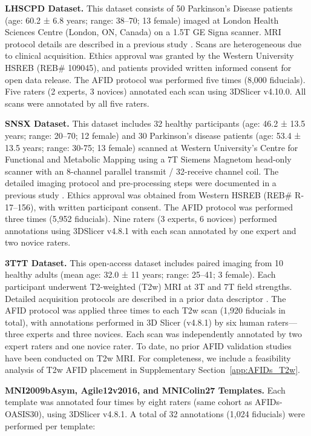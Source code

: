 \textbf{LHSCPD Dataset.} This dataset consists of 50 Parkinson’s Disease patients (age: 60.2 ± 6.8 years; range: 38–70; 13 female) imaged at London Health Sciences Centre (London, ON, Canada) on a 1.5T GE Signa scanner. MRI protocol details are described in a previous study \cite{Abbass2022-lf}. Scans are heterogeneous due to clinical acquisition. Ethics approval was granted by the Western University HSREB (REB\# 109045), and patients provided written informed consent for open data release. The AFID protocol was performed five times (8,000 fiducials). Five raters (2 experts, 3 novices) annotated each scan using 3DSlicer v4.10.0. All scans were annotated by all five raters.

\textbf{SNSX Dataset.} This dataset includes 32 healthy participants (age: 46.2 ± 13.5 years; range: 20–70; 12 female) and 30 Parkinson's disease patients (age: 53.4 ± 13.5 years; range: 30-75; 13 female) scanned at Western University's Centre for Functional and Metabolic Mapping using a 7T Siemens Magnetom head-only scanner with an 8-channel parallel transmit / 32-receive channel coil. The detailed imaging protocol and pre-processing steps were documented in a previous study \cite{Lau2020-dh}. Ethics approval was obtained from Western HSREB (REB\# R-17–156), with written participant consent. The AFID protocol was performed three times (5,952 fiducials). Nine raters (3 experts, 6 novices) performed annotations using 3DSlicer v4.8.1 with each scan annotated by one expert and two novice raters.

\textbf{3T7T Dataset.} This open-access dataset includes paired imaging from 10 healthy adults (mean age: 32.0 ± 11 years; range: 25–41; 3 female). Each participant underwent T2-weighted (T2w) MRI at 3T and 7T field strengths. Detailed acquisition protocols are described in a prior data descriptor \cite{Chen2023-cn}. The AFID protocol was applied three times to each T2w scan (1,920 fiducials in total), with annotations performed in 3D Slicer (v4.8.1) by six human raters—three experts and three novices. Each scan was independently annotated by two expert raters and one novice rater. To date, no prior AFID validation studies have been conducted on T2w MRI. For completeness, we include a feasibility analysis of T2w AFID placement in Supplementary Section~\ref{app:AFIDs_T2w}.


\textbf{MNI2009bAsym, Agile12v2016, and MNIColin27 Templates.} Each template was annotated four times by eight raters (same cohort as AFIDs-OASIS30), using 3DSlicer v4.8.1. A total of 32 annotations (1,024 fiducials) were performed per template:


